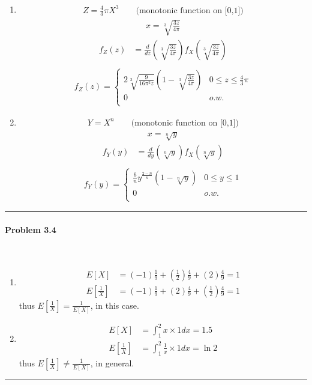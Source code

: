 \documentclass[12pt, letterpaper]{scrartcl}
\begin{document}
\begin{enumerate}[((a))]
    \item
    \begin{align*}
        Z=\frac{4}{3}\pi X^3 \qquad \textrm{(monotonic function on [0,1])}
    \end{align*}
    \begin{align*}
        x=\sqrt[3]{\frac{3z}{4\pi}}
    \end{align*}
    \begin{align*}
        f_Z(z)&=\frac{d}{dz}(\sqrt[3]{\frac{3z}{4\pi}})f_X(\sqrt[3]{\frac{3z}{4\pi}})\\
    \end{align*}
    \begin{align*}
        f_Z(z)=
        \begin{cases} 
            2\sqrt[3]{\frac{9}{16\pi^2z}}(1-\sqrt[3]{\frac{3z}{4\pi}}) & 0 \leq z \leq \frac{4}{3}\pi\\
            0 & o.w.\\
        \end{cases}
    \end{align*}
    \item
    \begin{align*}
        Y=X^n \qquad \textrm{(monotonic function on [0,1])}
    \end{align*}
    \begin{align*}
        x=\sqrt[n]{y}
    \end{align*}
    \begin{align*}
        f_Y(y)&=\frac{d}{dy}(\sqrt[n]{y})f_X(\sqrt[n]{y})\\
    \end{align*}
    \begin{align*}
        f_Y(y)=
        \begin{cases} 
            \frac{6}{n}y^{\frac{2-n}{n}}(1-\sqrt[n]{y}) & 0 \leq y \leq 1\\
            0 & o.w.\\
        \end{cases}
    \end{align*}
\end{enumerate}
\hrule
\paragraph*{Problem 3.4} \hfill\\
\begin{enumerate}[((a))]
    \item
    \begin{align*}
        E[X]&=(-1)\frac{1}{9}+(\frac{1}{2})\frac{4}{9}+(2)\frac{4}{9}=1\\
        E[\frac{1}{X}]&=(-1)\frac{1}{9}+(2)\frac{4}{9}+(\frac{1}{2})\frac{4}{9}=1
    \end{align*}
    thus $E[\frac{1}{X}]= \frac{1}{E[X]}$, in this case.
    \item
    \begin{align*}
        E[X]&=\int_1^2x\times1dx=1.5\\
        E[\frac{1}{X}]&=\int_1^2\frac{1}{x}\times1dx=\ln2
    \end{align*}
    thus $E[\frac{1}{X}]\neq \frac{1}{E[X]}$, in general.
\end{enumerate}
\hrule
\end{document}
